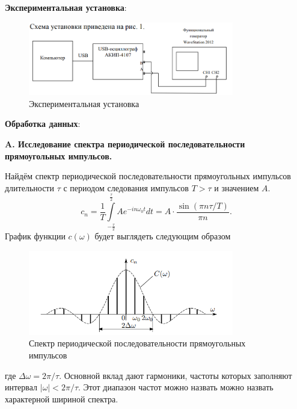 \documentclass[a4paper,12pt]{article}
\begin{document}
\textbf{Экспериментальная установка}:
\begin{figure}[H]\label{fig: Ustanovka}
    \centering
    \includegraphics[width = 0.8\textwidth]{Установка.png}
     \caption{Экспериментальная установка}
\end{figure}

\textbf{Обработка данных}:  

\textbf{A. Исследование спектра периодической последовательности прямоугольных импульсов.}

Найдём спектр периодической последовательности прямоугольных импульсов длительности $\tau$ с периодом следования импульсов $T > \tau$ и значением $A$.
\[c_n = \frac{1}{T} \int\limits_{-\frac{\tau}{2}}^{\frac{\tau}{2}} A e^{-i n \omega_0 t} dt = A \cdot \frac{\sin(\pi n \tau / T)}{\pi n}.\]
График функции $c(\omega)$ будет выглядеть следующим образом
\begin{figure}[H]\label{fig: Pryamoug impulses spektr}
    \centering
    \includegraphics[width = 0.8\textwidth]{Прямоугольные импульсы.png}
    \caption{Спектр периодической последовательности прямоугольных импульсов}
\end{figure}
где $\Delta \omega = 2 \pi / \tau$. Основной вклад дают гармоники, частоты которых заполняют интервал $|\omega| < 2 \pi / \tau$. Этот диапазон частот можно назвать можно назвать характерной шириной спектра.
\end{document}
